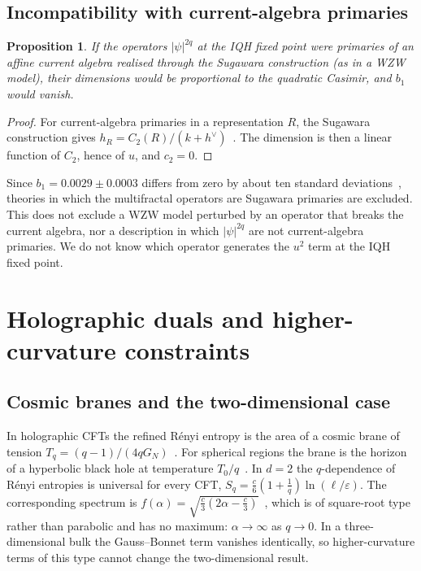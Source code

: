 \documentclass[11pt]{article}
\newtheorem{proposition}{Proposition}[section]
\theoremstyle{definition}\newtheorem{definition}{Definition}[section]
\theoremstyle{remark}\newtheorem*{remark}{Remark}
\newcommand{\GN}{G_N}
\begin{document}
\subsection{Incompatibility with current-algebra primaries}
\begin{proposition}
\label{prop:wzw}
If the operators $|\psi|^{2q}$ at the IQH fixed point were primaries of an affine current algebra realised
through the Sugawara construction (as in a WZW model), their dimensions would be proportional to the quadratic
Casimir, and $b_1$ would vanish.
\end{proposition}
\begin{proof}
For current-algebra primaries in a representation $R$, the Sugawara construction gives
$h_R=C_2(R)/(k+h^\vee)$~\cite{DiFrancesco}. The dimension is then a linear function of $C_2$, hence of $u$, and
$c_2=0$.
\end{proof}
Since $b_1=0.0029\pm0.0003$ differs from zero by about ten standard deviations~\cite{EMM}, theories in which the
multifractal operators are Sugawara primaries are excluded. This does not exclude a WZW model perturbed by an
operator that breaks the current algebra, nor a description in which $|\psi|^{2q}$ are not current-algebra
primaries. We do not know which operator generates the $u^2$ term at the IQH fixed point.

\section{Holographic duals and higher-curvature constraints}
\label{sec:holo}

\subsection{Cosmic branes and the two-dimensional case}
In holographic CFTs the refined R\'enyi entropy is the area of a cosmic brane of tension
$T_q=(q-1)/(4q\GN)$~\cite{Dong}. For spherical regions the brane is the horizon of a hyperbolic black hole at
temperature $T_0/q$~\cite{HMSY}. In $d=2$ the $q$-dependence of R\'enyi entropies is universal for every CFT,
$S_q=\frac c6(1+\frac1q)\ln(\ell/\varepsilon)$. The corresponding spectrum is
$f(\alpha)=\sqrt{\frac c3(2\alpha-\frac c3)}$~\cite{CL}, which is of square-root type rather than parabolic and has
no maximum: $\alpha\to\infty$ as $q\to0$. In a three-dimensional bulk the Gauss--Bonnet term vanishes
identically, so higher-curvature terms of this type cannot change the two-dimensional result.
\end{document}
